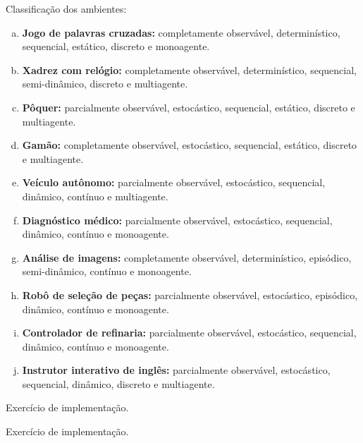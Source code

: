 \begin{solution}
Classificação dos ambientes:
\begin{enumerate}[a.]
	\item \textbf{Jogo de palavras cruzadas:} completamente observável, determinístico, sequencial, estático, discreto e monoagente.
	\item \textbf{Xadrez com relógio:} completamente observável, determinístico, sequencial, semi-dinâmico, discreto e multiagente.
	\item \textbf{Pôquer:} parcialmente observável, estocástico, sequencial, estático, discreto e multiagente.
	\item \textbf{Gamão:} completamente observável, estocástico, sequencial, estático, discreto e multiagente.
	\item \textbf{Veículo autônomo:} parcialmente observável, estocástico, sequencial, dinâmico, contínuo e multiagente.
	\item \textbf{Diagnóstico médico:} parcialmente observável, estocástico, sequencial, dinâmico, contínuo e monoagente.
	\item \textbf{Análise de imagens:} completamente observável, determinístico, episódico, semi-dinâmico, contínuo e monoagente.
	\item \textbf{Robô de seleção de peças:} parcialmente observável, estocástico, episódico, dinâmico, contínuo e monoagente.
	\item \textbf{Controlador de refinaria:} parcialmente observável, estocástico, sequencial, dinâmico, contínuo e monoagente.
	\item \textbf{Instrutor interativo de inglês:} parcialmente observável, estocástico, sequencial, dinâmico, discreto e multiagente.
\end{enumerate}
\end{solution}

\begin{solution}
Exercício de implementação.
\end{solution}

\begin{solution}
Exercício de implementação.
\end{solution}

